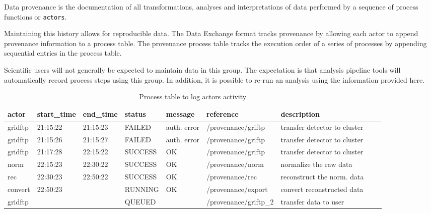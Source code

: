 Data provenance is the documentation of all transformations, analyses and 
interpretations of data performed by a sequence of process functions or {\tt {actors}}. 

Maintaining this history allows for reproducible data. The Data Exchange format 
tracks provenance by allowing each actor to append provenance information to a process table. 
The provenance process table tracks the execution order of a series of processes
by appending sequential entries in the process table.

Scientific users will not generally be expected to maintain data in
this group. The expectation is that analysis pipeline tools will automatically
record process steps using this group. In addition, it is possible to re-run
an analysis using the information provided here.

\begin{table}[h!]\sffamily \footnotesize
\caption{Process table to log actors activity}
\begin{tabular}{l l l l l l l l l }
\toprule
\bfseries actor & \bfseries start\_time & \bfseries end\_time  & \bfseries status & \bfseries message & \bfseries reference & \bfseries description \\

\midrule
gridftp &  21:15:22   & 21:15:23 & FAILED  & auth. error & /provenance/griftp & transfer detector to cluster \\
gridftp &  21:15:26   & 21:15:27 & FAILED  & auth. error & /provenance/griftp & transfer detector to cluster \\
gridftp &  21:17:28   & 22:15:22 & SUCCESS  & OK & /provenance/griftp & transfer detector to cluster \\
norm &  22:15:23   & 22:30:22 & SUCCESS  & OK & /provenance/norm & normalize the raw data \\
rec &  22:30:23   & 22:50:22 & SUCCESS  & OK & /provenance/rec & reconstruct the norm. data \\
convert &  22:50:23   &  & RUNNING  & OK & /provenance/export & convert reconstructed data \\
gridftp &     &  & QUEUED  &  & /provenance/griftp\_2 & transfer data to user \\
\midrule
\bottomrule
\end{tabular}
\label{table:provenance}
\end{table}

